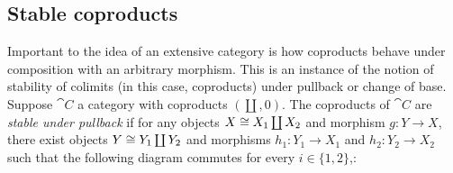 \subsection{Stable coproducts}
\label{sec:stable-coproducts}

Important to the idea of an extensive category is how coproducts behave under composition with an arbitrary
morphism. This is an instance of the notion of stability of colimits (in this case, coproducts) under pullback
or change of base. Suppose $\cat{C}$ a category with coproducts $(\coprod, 0)$. The coproducts of $\cat{C}$
are \emph{stable under pullback} if for any objects $X \cong X_1 \coprod X_2$ and morphism $g: Y \to X$, there
exist objects $Y \cong Y_1 \coprod Y_2$ and morphisms $h_1: Y_1 \to X_1$ and $h_2: Y_2 \to X_2$ such that the
following diagram commutes for every $i \in \{1, 2\}$,:

\begin{center}
\end{center}
